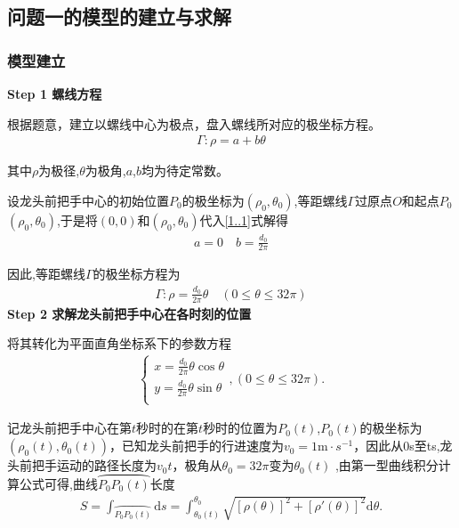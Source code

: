 \documentclass{cumcmthesis}
\begin{document}
\subsection{问题一的模型的建立与求解}
\subsubsection{模型建立}
\noindent \textbf{Step 1 螺线方程}
\par 根据题意，建立以螺线中心为极点，盘入螺线所对应的极坐标方程。
\begin{align}\label{1..1}
    \varGamma :\rho =a+b\theta 
    \end{align}
    \par 其中\(\rho\)为极径,\(\theta\)为极角,\(a\),\(b\)均为待定常数。
    \par 设龙头前把手中心的初始位置\(P_0\)的极坐标为\((\rho _0,\theta _0)\),等距螺线\(\varGamma\)过原点\(O\)和起点\(P_0\)\((\rho _0,\theta _0)\),于是将\((0,0)\)和\((\rho _0,\theta _0)\)代入\eqref{1..1}式解得
    \begin{align}\label{1.........1}
        a = 0\quad b = \frac{d_0}{2\pi} 
    \end{align}
    \par 因此,等距螺线\(\varGamma\)的极坐标方程为
    \begin{align}
    \varGamma :\rho =\frac{d_0}{2\pi}\theta\quad (0\leqslant \theta \leqslant 32\pi) \label{0.1}
    \end{align}
    \textbf{Step 2 求解龙头前把手中心在各时刻的位置}
    \par 将其转化为平面直角坐标系下的参数方程
    \begin{align}
    \begin{cases}
    x=\frac{d_0}{2\pi}\theta \cos \theta\\
    y=\frac{d_0}{2\pi}\theta \sin \theta\\
    \end{cases},(0\leqslant \theta \leqslant 32\pi) .\label{0.0}
    \end{align}
    
    \par 记龙头前把手中心在第\(t\)秒时的在第\(t\)秒时的位置为\(P_0(t)\),\(P_0(t)\)的极坐标为\((\rho _0(t),\theta _0(t))\)，已知龙头前把手的行进速度为\(v_0 = 1\mathrm{m}\cdot s^{-1}\)，因此从0s至ts,龙头前把手运动的路径长度为$v_0t$，极角从$\theta_0=32\pi $变为$\theta _0\left( t \right)$ ,由第一型曲线积分计算公式可得,曲线$\wideparen{P_0P_0\left( t \right) }$长度
    \begin{align}
        S=\int_{\wideparen{P_0P_0(t)}}{\mathrm{d}s}=\int_{\theta _0(t)}^{\theta _0}{\sqrt{[\rho (\theta )]^2+[\rho ' (\theta )]^2}\mathrm{d}\theta}.\label{1.1}
        \end{align}
   
\end{document}
